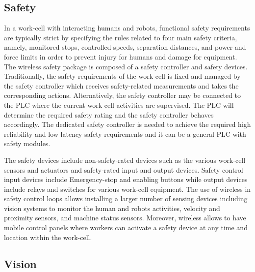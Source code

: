 \documentclass[journal, twoside]{IEEEtran}
\begin{document}
	\subsection{Safety}\label{sec:safety}
    
    In a work-cell with interacting humans and robots, functional safety requirements are typically strict by specifying the rules related to four main safety criteria, namely, monitored stops, controlled speeds, separation distances, and power and force limits in order to prevent injury for humans and damage for equipment. The wireless safety package is composed of a safety controller and safety devices. Traditionally, the safety requirements of the work-cell is fixed and managed by the safety controller which receives safety-related measurements and takes the corresponding actions. Alternatively, the safety controller may be connected to the PLC where the current work-cell activities are supervised.  The PLC will determine the required safety rating and the safety controller behaves accordingly. The dedicated safety controller is needed to achieve the required high reliability and low latency safety requirements and it can be a general PLC with safety modules. 
    
    The safety devices include non-safety-rated devices such as the various work-cell sensors and actuators and safety-rated input and output devices. Safety control input devices include Emergency-stop and enabling buttons while output devices include relays and switches for various work-cell equipment. The use of wireless in safety control loops allows installing a larger number of sensing devices including vision systems to monitor the human and robots activities, velocity and proximity sensors, and machine status sensors. Moreover, wireless allows to have mobile control panels where workers can activate a safety device at any time and location within the work-cell.        
	
	\subsection{Vision}\label{sec:vision}
    
\end{document}
